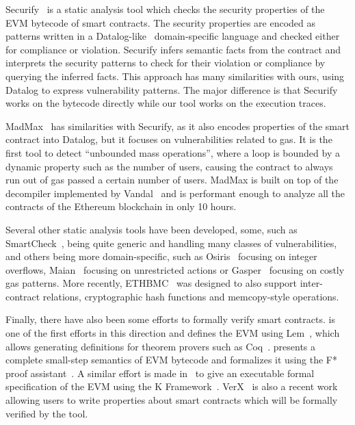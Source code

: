 Securify~\cite{Tsankov2018} is a static analysis tool which checks the security properties of the EVM bytecode of smart contracts.
The security properties are encoded as patterns written in a Datalog-like~\cite{ullman1984principles} domain-specific language and checked either for compliance or violation.
Securify infers semantic facts from the contract and interprets the security patterns to check for their violation or compliance by querying the inferred facts.
This approach has many similarities with ours, using Datalog to express vulnerability patterns.
The major difference is that Securify works on the bytecode directly while our tool works on the execution traces.

MadMax~\cite{Grech2018} has similarities with Securify, as it also encodes properties of the smart contract into Datalog, but it focuses on vulnerabilities related to gas.
It is the first tool to detect ``unbounded mass operations'', where a loop is bounded by a dynamic property such as the number of users, causing the contract to always run out of gas passed a certain number of users.
MadMax is built on top of the decompiler implemented by Vandal~\cite{Brent2018} and is performant enough to analyze all the contracts of the Ethereum blockchain in only 10 hours.

Several other static analysis tools have been developed, some, such as SmartCheck~\cite{Tikhomirov2017}, being quite generic and handling many classes of vulnerabilities, and others being more domain-specific, such as Osiris~\cite{torres2018osiris} focusing on integer overflows, Maian~\cite{Nikolic2018a} focusing on unrestricted actions or Gasper~\cite{Chen2017} focusing on costly gas patterns.
More recently, ETHBMC~\cite{251546} was designed to also support inter-contract relations, cryptographic hash functions and memcopy-style operations.

Finally, there have also been some efforts to formally verify smart contracts.
\cite{Hirai2017} is one of the first efforts in this direction and defines the EVM using Lem~\cite{mulligan2014lem}, which allows generating definitions for theorem provers such as Coq~\cite{barras1997coq}.
\cite{Grishchenko2018} presents a complete small-step semantics of EVM bytecode and formalizes it using the F* proof assistant~\cite{SwamyCFSBY11}.
A similar effort is made in~\cite{Hildenbrandt2018} to give an executable formal specification of the EVM using the K Framework~\cite{rosu-serbanuta-2010-jlap}.
VerX~\cite{permenev2019verx} is also a recent work allowing users to write properties about smart contracts which will be formally verified by the tool.

